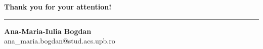 \documentclass[aspectratio=169]{beamer}
\begin{document}
{
\begin{frame}
  \begin{center}
    \vspace{1.5cm}
    {\color{nlpblue}\Large\bfseries Thank you for your attention!}

    \vspace{1.2cm}
    {\color{nlpblue!30}\rule{0.5\textwidth}{0.4pt}}
    \vspace{1.2cm}

    {\normalsize\textbf{Ana-Maria-Iulia Bogdan}}\\[8pt]
    {\footnotesize\color{nlpblue} ana\_maria.bogdan@stud.acs.upb.ro}
  \end{center}
\end{frame}
}
\end{document}
